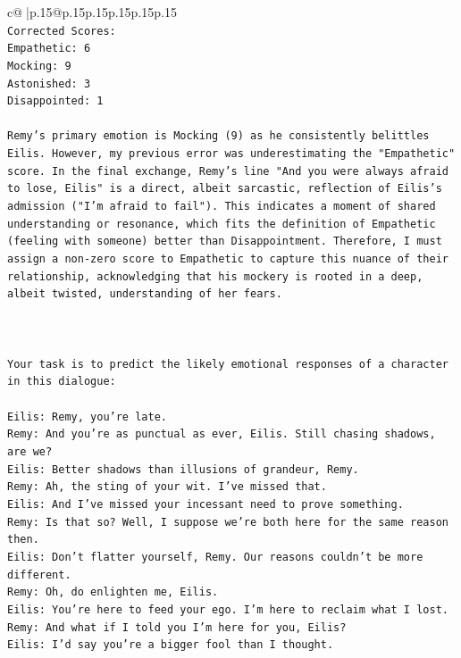 \documentclass{article}
\begin{document}
{\begin{supertabular}{c@{$\;$}|p{.15\linewidth}@{}p{.15\linewidth}p{.15\linewidth}p{.15\linewidth}p{.15\linewidth}p{.15\linewidth}}
{{{\\ 
\texttt{Corrected Scores:} \\
\texttt{Empathetic: 6} \\
\texttt{Mocking: 9} \\
\texttt{Astonished: 3} \\
\texttt{Disappointed: 1} \\
\\ 
\texttt{Remy's primary emotion is Mocking (9) as he consistently belittles Eilis. However, my previous error was underestimating the "Empathetic" score. In the final exchange, Remy's line "And you were always afraid to lose, Eilis" is a direct, albeit sarcastic, reflection of Eilis's admission ("I'm afraid to fail"). This indicates a moment of shared understanding or resonance, which fits the definition of Empathetic (feeling with someone) better than Disappointment. Therefore, I must assign a non{-}zero score to Empathetic to capture this nuance of their relationship, acknowledging that his mockery is rooted in a deep, albeit twisted, understanding of her fears.} \\
\\ 
\\ 
\\ 
\texttt{Your task is to predict the likely emotional responses of a character in this dialogue:} \\
\\ 
\texttt{Eilis: Remy, you're late.} \\
\texttt{Remy: And you're as punctual as ever, Eilis. Still chasing shadows, are we?} \\
\texttt{Eilis: Better shadows than illusions of grandeur, Remy.} \\
\texttt{Remy: Ah, the sting of your wit. I've missed that. } \\
\texttt{Eilis: And I've missed your incessant need to prove something.} \\
\texttt{Remy: Is that so? Well, I suppose we're both here for the same reason then.} \\
\texttt{Eilis: Don't flatter yourself, Remy. Our reasons couldn't be more different.} \\
\texttt{Remy: Oh, do enlighten me, Eilis. } \\
\texttt{Eilis: You're here to feed your ego. I'm here to reclaim what I lost.} \\
\texttt{Remy: And what if I told you I'm here for you, Eilis?} \\
\texttt{Eilis: I'd say you're a bigger fool than I thought.} \\
}}}
\end{supertabular}}
\end{document}
